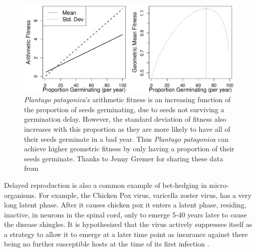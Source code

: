   \begin{figure}
\begin{center}
\includegraphics[width= \textwidth]{Journal_figs/single_locus_selection/Gremer_hedging_example/Gremer_hedging_example.pdf}
\end{center}
\caption{  {\it Plantago patagonica}'s arithmetic fitness is an
  increasing function of the proportion of seeds germinating, due to
  seeds not surviving a germination delay. However, the standard
  deviation of fitness also increases with this proportion as they are
  more likely to have all of their seeds germinate in a bad year. Thus
  {\it Plantago patagonica}  can achieve higher geometric fitness by
  only having a proportion of their seeds germinate. Thanks to Jenny
  Gremer for sharing these data from \citet{gremer2014bet} } \label{fig:desert_bet_hedging}
\end{figure}



Delayed reproduction is also a common example of bet-hedging in
micro-organisms. For example, the Chicken Pox virus, varicella zoster
virus, has a very long latent phase. After it causes chicken pox it enters a latent phase, residing, inactive, in neurons in
the spinal cord, only to emerge 5-40 years later to cause the disease
shingles. It is hypothesized that the virus actively suppresses itself
as a strategy to allow it to emerge at a later time point as insurance
against there being no further susceptible hosts at the time of its
first infection \citep{stumpf2002herpes}. 




